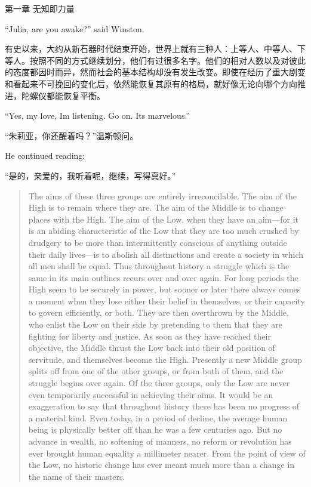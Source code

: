 \begin{paracol}{2}
\switchcolumn

第一章 无知即力量

\switchcolumn*

``Julia, are you awake?'' said Winston.

\switchcolumn

有史以来，大约从新石器时代结束开始，世界上就有三种人：上等人、中等人、下等人。按照不同的方式继续划分，他们有过很多名字。他们的相对人数以及对彼此的态度都因时而异，然而社会的基本结构却没有发生改变。即使在经历了重大剧变和看起来不可挽回的变化后，依然能恢复其原有的格局，就好像无论向哪个方向推进，陀螺仪都能恢复平衡。

\switchcolumn*

``Yes, my love, I\textquotesingle m listening. Go on.
It\textquotesingle s marvelous.''

\switchcolumn

``朱莉亚，你还醒着吗？''温斯顿问。

\switchcolumn*

He continued reading:

\switchcolumn

``是的，亲爱的，我听着呢，继续，写得真好。''

\switchcolumn*

\begin{quotation}
The aims of these three groups are entirely irreconcilable. The aim of
the High is to remain where they are. The aim of the Middle is to change
places with the High. The aim of the Low, when they have an aim---for it
is an abiding characteristic of the Low that they are too much crushed
by drudgery to be more than intermittently conscious of anything outside
their daily lives---is to abolish all distinctions and create a society
in which all men shall be equal. Thus throughout history a struggle
which is the same in its main outlines recurs over and over again. For
long periods the High seem to be securely in power, but sooner or later
there always comes a moment when they lose either their belief in
themselves, or their capacity to govern efficiently, or both. They are
then overthrown by the Middle, who enlist the Low on their side by
pretending to them that they are fighting for liberty and justice. As
soon as they have reached their objective, the Middle thrust the Low
back into their old position of servitude, and themselves become the
High. Presently a new Middle group splits off from one of the other
groups, or from both of them, and the struggle begins over again. Of the
three groups, only the Low are never even temporarily successful in
achieving their aims. It would be an exaggeration to say that throughout
history there has been no progress of a material kind. Even today, in a
period of decline, the average human being is physically better off than
he was a few centuries ago. But no advance in wealth, no softening of
manners, no reform or revolution has ever brought human equality a
millimeter nearer. From the point of view of the Low, no historic change
has ever meant much more than a change in the name of their masters.


\end{quotation}
\end{paracol}
